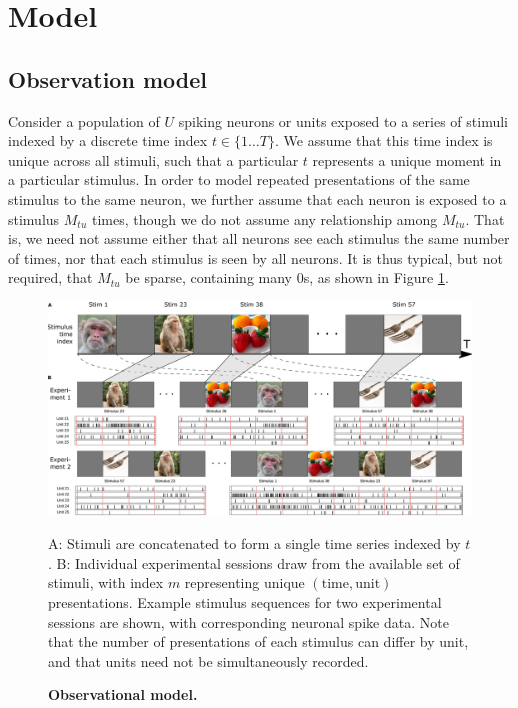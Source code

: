 \documentclass[10pt,letterpaper]{article}
\newcommand{\added}[1]{\textcolor{added}{#1}}
\begin{document}
\section*{Model}
\label{model_sec}

\subsection*{Observation model}
Consider a population of $U$ spiking neurons or units exposed to a series of stimuli indexed by a \added{discrete} time index $t\in \lbrace 1\ldots T\rbrace$. We assume that this time index is unique across all stimuli, such that a particular $t$ represents a unique moment in a particular stimulus. In order to model repeated presentations of the same stimulus to the same neuron, we further assume that each neuron is exposed to a stimulus $M_{tu}$ times, though we do not assume any relationship among $M_{tu}$. That is, we need not assume either that all neurons see each stimulus the same number of times, nor that each stimulus is seen by all neurons. It is thus typical, but not required, that $M_{tu}$ be sparse, containing many 0s, as shown in Figure \ref{fig:movie}.

\begin{figure}[!h]
    \includegraphics[width=\linewidth]{movie}
	\caption{\bf Observational model.}
    A: Stimuli are concatenated to form a single time series indexed by $t$. B: Individual experimental sessions draw from the available set of stimuli, with index $m$ representing unique $(\mathrm{time}, \mathrm{unit})$ presentations. Example stimulus sequences for two \added{experimental sessions} are shown, with corresponding neuronal spike data. Note that the number of \added{presentations of each stimulus can differ by unit, and that units need not be simultaneously recorded.}
	\label{fig:movie}
\end{figure}
\end{document}
